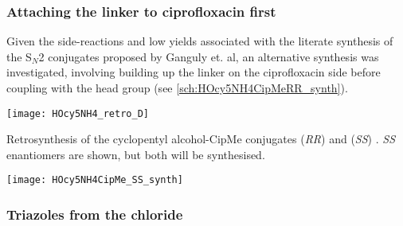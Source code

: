 \subsubsection{Attaching the linker to ciprofloxacin first\label{sec:CipMe_linker}}

Given the side-reactions and low yields associated with the literate synthesis of the S$_N$2 conjugates proposed by Ganguly et. al\cite{Ganguly2011}, an alternative synthesis was investigated, involving building up the linker on the ciprofloxacin side before coupling with the head group (see \ref{sch:HOcy5NH4CipMeRR_synth}).

\begin{scheme}[H]
	\begin{center}
		\texttt{[image: HOcy5NH4\_retro\_D]}
		\caption{Retrosynthesis of the cyclopentyl alcohol-CipMe conjugates (\textit{RR})  and (\textit{SS}) . \textit{SS} enantiomers are shown, but both will be synthesised.\label{sch:HOcy5NH4_retro_D}}
	\end{center}
\end{scheme}




\begin{scheme}[H]
	\begin{center}
		\texttt{[image: HOcy5NH4CipMe\_SS\_synth]}
		\caption{Synthesis of . 
			a) NaI, TEA, MeCN, 100oC, 16h, 50 \%. %
			b) TFA,  CH2Cl2, r.t., 18h, 96 \%. %
			c) EDC, HOBt, DIPEA, DMF, 35 \%. %
			\label{sch:HOcy5NH4CipMe_SS_synth}}
	\end{center}
\end{scheme}



\subsubsection{Triazoles from the chloride\label{sec:Cl4Cl}}

